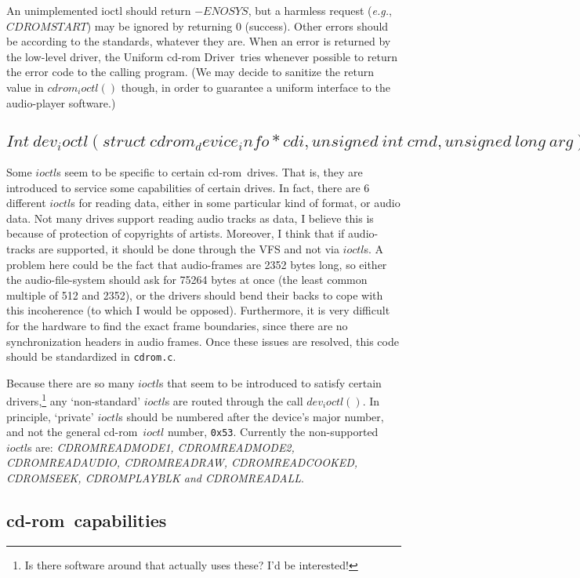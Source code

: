 \documentclass{article}
\def\cdrom{{\sc cd-rom}}
\def\UCD{{\sc Uniform cd-rom Driver}}
\def\cdromc{{\tt {cdrom.c}}}
\def\fo{\sl}                    %
\def\eg{{\fo e.g.}}
\begin{document}
An unimplemented ioctl should return $-ENOSYS$, but a harmless request
(\eg, $CDROMSTART$) may be ignored by returning 0 (success). Other
errors should be according to the standards, whatever they are. When
an error is returned by the low-level driver, the \UCD\ tries whenever
possible to return the error code to the calling program. (We may decide
to sanitize the return value in $cdrom_ioctl()$ though, in order to
guarantee a uniform interface to the audio-player software.)

\subsection{$Int\ dev_ioctl(struct\ cdrom_device_info * cdi, unsigned\ int\
  cmd, unsigned\ long\ arg)$}

Some $ioctl$s seem to be specific to certain \cdrom\ drives. That is,
they are introduced to service some capabilities of certain drives. In
fact, there are 6 different $ioctl$s for reading data, either in some
particular kind of format, or audio data. Not many drives support
reading audio tracks as data, I believe this is because of protection
of copyrights of artists. Moreover, I think that if audio-tracks are
supported, it should be done through the VFS and not via $ioctl$s. A
problem here could be the fact that audio-frames are 2352 bytes long,
so either the audio-file-system should ask for 75264 bytes at once
(the least common multiple of 512 and 2352), or the drivers should
bend their backs to cope with this incoherence (to which I would be
opposed).  Furthermore, it is very difficult for the hardware to find
the exact frame boundaries, since there are no synchronization headers
in audio frames.  Once these issues are resolved, this code should be
standardized in \cdromc.

Because there are so many $ioctl$s that seem to be introduced to
satisfy certain drivers,\footnote{Is there software around that
  actually uses these? I'd be interested!} any `non-standard' $ioctl$s
are routed through the call $dev_ioctl()$. In principle, `private'
$ioctl$s should be numbered after the device's major number, and not
the general \cdrom\ $ioctl$ number, {\tt {0x53}}. Currently the
non-supported $ioctl$s are: {\it CDROMREADMODE1, CDROMREADMODE2,
  CDROMREADAUDIO, CDROMREADRAW, CDROMREADCOOKED, CDROMSEEK,
  CDROMPLAY\-BLK and CDROM\-READALL}.


\subsection{\cdrom\ capabilities}
\label{capability}
\end{document}
